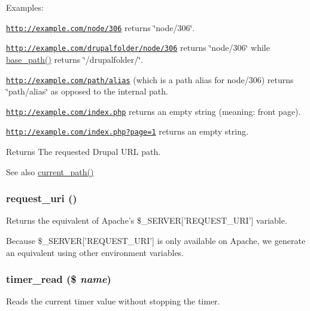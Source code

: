Examples:
\begin{DoxyItemize}
\item \href{http://example.com/node/306}{\tt http://example.com/node/306} returns \char`\"{}node/306\char`\"{}.
\item \href{http://example.com/drupalfolder/node/306}{\tt http://example.com/drupalfolder/node/306} returns \char`\"{}node/306\char`\"{} while \hyperlink{common_8inc_ae227697e9c239f09fd7e36f71afde771}{base\_\-path()} returns \char`\"{}/drupalfolder/\char`\"{}.
\item \href{http://example.com/path/alias}{\tt http://example.com/path/alias} (which is a path alias for node/306) returns \char`\"{}path/alias\char`\"{} as opposed to the internal path.
\item \href{http://example.com/index.php}{\tt http://example.com/index.php} returns an empty string (meaning: front page).
\item \href{http://example.com/index.php?page=1}{\tt http://example.com/index.php?page=1} returns an empty string.
\end{DoxyItemize}

\begin{DoxyReturn}{Returns}
The requested Drupal URL path.
\end{DoxyReturn}
\begin{DoxySeeAlso}{See also}
\hyperlink{path_8inc_a97aaa03027cbf6f0ffdd9a4bf5c9a31c}{current\_\-path()} 
\end{DoxySeeAlso}
\hypertarget{bootstrap_8inc_a80b52d5331d840440b5e3dfe82dd7ea2}{
\subsubsection[{request\_\-uri}]{\setlength{\rightskip}{0pt plus 5cm}request\_\-uri ()}}
\label{bootstrap_8inc_a80b52d5331d840440b5e3dfe82dd7ea2}
Returns the equivalent of Apache's \$\_\-SERVER\mbox{[}'REQUEST\_\-URI'\mbox{]} variable.

Because \$\_\-SERVER\mbox{[}'REQUEST\_\-URI'\mbox{]} is only available on Apache, we generate an equivalent using other environment variables. \hypertarget{bootstrap_8inc_ad093007ebd04feb2a1394ff5774eb6d4}{
\subsubsection[{timer\_\-read}]{\setlength{\rightskip}{0pt plus 5cm}timer\_\-read (\$ {\em name})}}
\label{bootstrap_8inc_ad093007ebd04feb2a1394ff5774eb6d4}
Reads the current timer value without stopping the timer.


